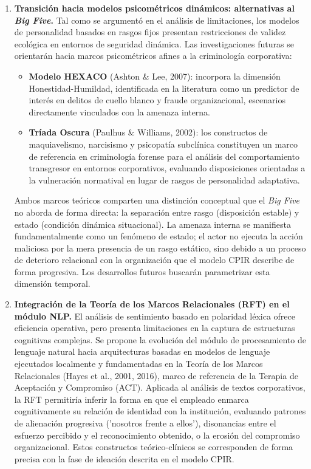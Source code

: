 \documentclass[IB]{TFUOC}%
\begin{document}
\begin{enumerate}
    \item \textbf{Transición hacia modelos psicométricos dinámicos: alternativas al \textit{Big Five}.}\newline
    Tal como se argumentó en el análisis de limitaciones, los modelos de personalidad basados en rasgos fijos presentan restricciones de validez ecológica en entornos de seguridad dinámica. Las investigaciones futuras se orientarán hacia marcos psicométricos afines a la criminología corporativa:
    
    \begin{itemize}
        \item \textbf{Modelo HEXACO} (Ashton \& Lee, 2007): incorpora la dimensión Honestidad-Humildad, identificada en la literatura como un predictor de interés en delitos de cuello blanco y fraude organizacional, escenarios directamente vinculados con la amenaza interna.
        
        \item \textbf{Tríada Oscura} (Paulhus \& Williams, 2002): los constructos de maquiavelismo, narcisismo y psicopatía subclínica constituyen un marco de referencia en criminología forense para el análisis del comportamiento transgresor en entornos corporativos, evaluando disposiciones orientadas a la vulneración normatival en lugar de rasgos de personalidad adaptativa.
    \end{itemize}
    
    \noindent Ambos marcos teóricos comparten una distinción conceptual que el \textit{Big Five} no aborda de forma directa: la separación entre rasgo (disposición estable) y estado (condición dinámica situacional). La amenaza interna se manifiesta fundamentalmente como un fenómeno de estado; el actor no ejecuta la acción maliciosa por la mera presencia de un rasgo estático, sino debido a un proceso de deterioro relacional con la organización que el modelo CPIR describe de forma progresiva. Los desarrollos futuros buscarán parametrizar esta dimensión temporal.

    \item \textbf{Integración de la Teoría de los Marcos Relacionales (RFT) en el módulo NLP.}\newline
    El análisis de sentimiento basado en polaridad léxica ofrece eficiencia operativa, pero presenta limitaciones en la captura de estructuras cognitivas complejas. Se propone la evolución del módulo de procesamiento de lenguaje natural hacia arquitecturas basadas en modelos de lenguaje ejecutados localmente y fundamentadas en la Teoría de los Marcos Relacionales (Hayes et al., 2001, 2016), marco de referencia de la Terapia de Aceptación y Compromiso (ACT). Aplicada al análisis de textos corporativos, la RFT permitiría inferir la forma en que el empleado enmarca cognitivamente su relación de identidad con la institución, evaluando patrones de alienación progresiva ('nosotros frente a ellos'), disonancias entre el esfuerzo percibido y el reconocimiento obtenido, o la erosión del compromiso organizacional. Estos constructos teórico-clínicos se corresponden de forma precisa con la fase de ideación descrita en el modelo CPIR.


\end{enumerate}
\end{document}

